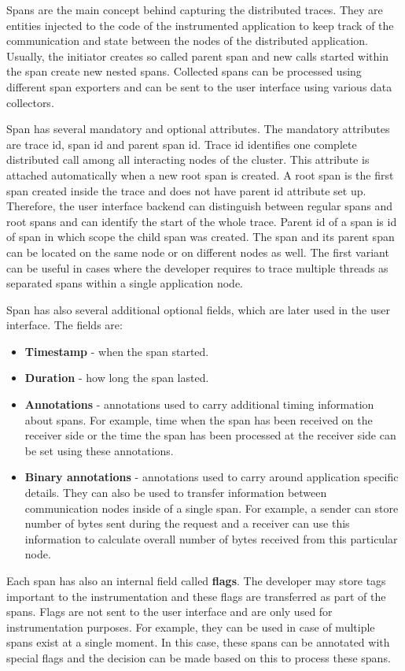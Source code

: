 Spans are the main concept behind capturing the distributed traces. They are entities injected to the code of the instrumented application to keep track of the communication and state between the nodes of the distributed application. Usually, the initiator creates so called parent span and new calls started within the span create new nested spans. Collected spans can be processed using different span exporters and can be sent to the user interface using various data collectors.

Span has several mandatory and optional attributes. The mandatory attributes are trace id, span id and parent span id. Trace id identifies one complete distributed call among all interacting nodes of the cluster. This attribute is attached automatically when a new root span is created. A root span is the first span created inside the trace and does not have parent id attribute set up. Therefore, the user interface backend can distinguish between regular spans and root spans and can identify the start of the whole trace. Parent id of a span is id of span in which scope the child span was created. The span and its parent span can be located on the same node or on different nodes as well. The first variant can be useful in cases where the developer requires to trace multiple threads as separated spans within a single application node.  

Span has also several additional optional fields, which are later used in the user interface. The fields are:
\begin{itemize}
	\item \textbf{Timestamp} - when the span started.
	\item \textbf{Duration} - how long the span lasted.
	\item \textbf{Annotations} - annotations used to carry additional timing information about spans. For example, time when the span has been received on the receiver side or the time the span has been processed at the receiver side can be set using these annotations.
	\item \textbf{Binary annotations} - annotations used to carry around application specific details. They can also be used to transfer information between communication nodes inside of a single span. For example, a sender can store number of bytes sent during the request and a receiver can use this information to calculate overall number of bytes received from this particular node.
\end{itemize}
Each span has also an internal field called \textbf{flags}. The developer may store tags important to the instrumentation and these flags are transferred as part of the spans. Flags are not sent to the user interface and are only used for instrumentation purposes. For example, they can be used in case of multiple spans exist at a single moment. In this case, these spans can be annotated with special flags and the decision can be made based on this to process these spans.

